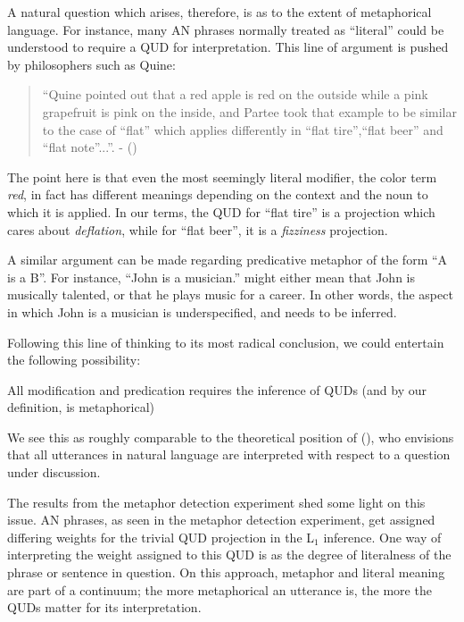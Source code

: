 \documentclass[10pt,letterpaper,twocolumn]{article}
\begin{document}
A natural question which arises, therefore, is as to the extent of metaphorical language. For instance, many AN phrases normally treated as ``literal'' could be understood to require a QUD for interpretation. This line of argument is pushed by philosophers such as Quine:
	\begin{quote}
		``Quine pointed out that a red apple is red on the outside while a pink grapefruit is pink on the inside, and Partee took that example to be similar to the case of ``flat'' which applies differently in ``flat tire'',``flat beer'' and ``flat note''...''. - (\cite{lahav}) 
	\end{quote}

The point here is that even the most seemingly literal modifier, the color term \emph{red}, in fact has different meanings depending on the context and the noun to which it is applied. In our terms, the QUD for ``flat tire'' is a projection which cares about \emph{deflation}, while for ``flat beer'', it is a \emph{fizziness} projection.


A similar argument can be made regarding predicative metaphor of the form ``A is a B''. For instance, ``John is a musician.'' might either mean that John is musically talented, or that he plays music for a career. In other words, the aspect in which John is a musician is underspecified, and needs to be inferred.

Following this line of thinking to its most radical conclusion, we could entertain the following possibility:
\begin{exe}
\ex All modification and predication requires the inference of QUDs (and by our definition, is metaphorical) \label{prop3}
\end{exe}

We see this as roughly comparable to the theoretical position of (\cite{roberts1996information}), who envisions that all utterances in natural language are interpreted with respect to a question under discussion. 

The results from the metaphor detection experiment shed some light on this issue. AN phrases, as seen in the metaphor detection experiment, get assigned differing weights for the trivial QUD projection in the L$_1$ inference. One way of interpreting the weight assigned to this QUD is as the degree of literalness of the phrase or sentence in question. On this approach, metaphor and literal meaning are part of a continuum; the more metaphorical an utterance is, the more the QUDs matter for its interpretation.
\end{document}

